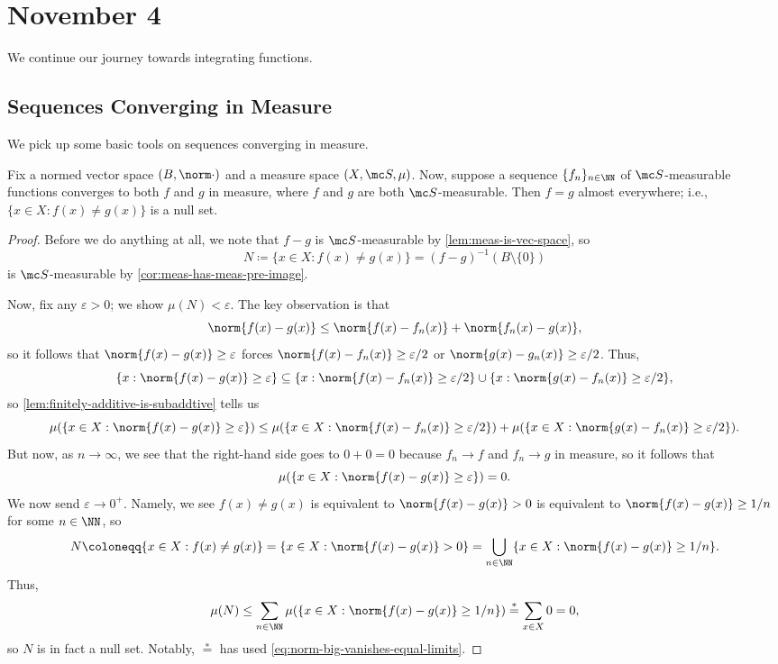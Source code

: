 \documentclass[../notes.tex]{subfiles}
\begin{document}
\section{November 4}

We continue our journey towards integrating functions.

\subsection{Sequences Converging in Measure}
We pick up some basic tools on sequences converging in measure.
\begin{lemma} \label{lem:converge-in-measure-uniq-ae}
	Fix a normed vector space $(B,\norm\cdot)$ and a measure space $(X,\mc S,\mu)$. Now, suppose a sequence $\{f_n\}_{n\in\NN}$ of $\mc S$-measurable functions converges to both $f$ and $g$ in measure, where $f$ and $g$ are both $\mc S$-measurable. Then $f=g$ almost everywhere; i.e., $\{x\in X:f(x)\ne g(x)\}$ is a null set.
\end{lemma}
\begin{proof}
	Before we do anything at all, we note that $f-g$ is $\mc S$-measurable by \autoref{lem:meas-is-vec-space}, so
	\[N\coloneqq\{x\in X:f(x)\ne g(x)\}=(f-g)^{-1}(B\setminus\{0\})\]
	is $\mc S$-measurable by \autoref{cor:meas-has-meas-pre-image}.
	
	Now, fix any $\varepsilon>0$; we show $\mu(N)<\varepsilon$. The key observation is that
	\[\norm{f(x)-g(x)}\le\norm{f(x)-f_n(x)}+\norm{f_n(x)-g(x)},\]
	so it follows that $\norm{f(x)-g(x)}\ge\varepsilon$ forces $\norm{f(x)-f_n(x)}\ge\varepsilon/2$ or $\norm{g(x)-g_n(x)}\ge\varepsilon/2$. Thus,
	\[\{x:\norm{f(x)-g(x)}\ge\varepsilon\}\subseteq\{x:\norm{f(x)-f_n(x)}\ge\varepsilon/2\}\cup\{x:\norm{g(x)-f_n(x)}\ge\varepsilon/2\},\]
	so \autoref{lem:finitely-additive-is-subaddtive} tells us
	\[\mu(\{x\in X:\norm{f(x)-g(x)}\ge\varepsilon\})\le\mu(\{x\in X:\norm{f(x)-f_n(x)}\ge\varepsilon/2\})+\mu(\{x\in X:\norm{g(x)-f_n(x)}\ge\varepsilon/2\}).\]
	But now, as $n\to\infty$, we see that the right-hand side goes to $0+0=0$ because $f_n\to f$ and $f_n\to g$ in measure, so it follows that
	\begin{equation}
		\mu(\{x\in X:\norm{f(x)-g(x)}\ge\varepsilon\})=0. \label{eq:norm-big-vanishes-equal-limits}
	\end{equation}
	We now send $\varepsilon\to0^+$. Namely, we see $f(x)\ne g(x)$ is equivalent to $\norm{f(x)-g(x)}>0$ is equivalent to $\norm{f(x)-g(x)}\ge1/n$ for some $n\in\NN$, so
	\[N\coloneqq\{x\in X:f(x)\ne g(x)\}=\{x\in X:\norm{f(x)-g(x)}>0\}=\bigcup_{n\in\NN}\{x\in X:\norm{f(x)-g(x)}\ge1/n\}.\]
	Thus,
	\[\mu(N)\le\sum_{n\in\NN}\mu(\{x\in X:\norm{f(x)-g(x)}\ge1/n\})\stackrel*=\sum_{x\in X}0=0,\]
	so $N$ is in fact a null set. Notably, $\stackrel*=$ has used \autoref{eq:norm-big-vanishes-equal-limits}.
\end{proof}
\end{document}
